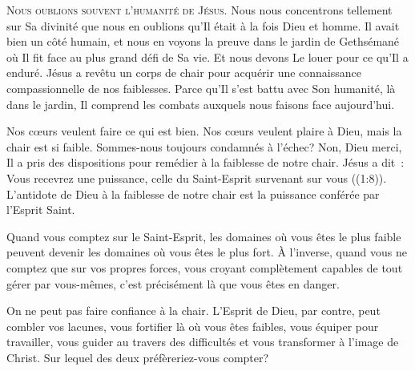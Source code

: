 


\lettrine{N}{ous oublions souvent l'humanité de Jésus.}
 Nous nous concentrons tellement sur Sa divinité que nous en oublions
 qu'Il était à la fois Dieu et homme. Il avait bien un côté humain,
 et nous en voyons la preuve dans le jardin de Gethsémané
 \ocadr où Il fit face au plus grand défi de Sa vie.
 Et nous devons Le  louer pour ce qu'Il a enduré.
 Jésus a revêtu un corps de chair pour acquérir une connaissance
 compassionnelle de nos faiblesses. Parce qu'Il s'est battu avec Son humanité,
 là dans le jardin, Il comprend les combats auxquels nous faisons
 face aujourd'hui.

Nos c\oe{}urs veulent faire ce qui est bien.
 Nos c\oe{}urs veulent plaire à Dieu, mais la chair est si faible.
 Sommes-nous toujours condamnés à l'échec? Non, Dieu merci,
 Il a pris des dispositions pour remédier à la faiblesse de notre chair.
 Jésus a dit~: 
 \og Vous recevrez une puissance, celle du Saint-Esprit survenant sur vous \fg{}
 ((1:8)).
 L'antidote de Dieu à la faiblesse de notre chair
 est la puissance conférée par l'Esprit Saint.


Quand vous comptez sur le Saint-Esprit, les domaines où vous êtes
 le plus faible peuvent devenir les domaines où vous êtes le plus fort.
 À l'inverse, quand vous ne comptez que sur vos propres forces,
 vous croyant complètement capables de tout gérer par vous-mêmes,
 c'est précisément là que vous êtes en danger.

On ne peut pas faire confiance à la chair.
 L'Esprit de Dieu, par contre, peut combler vos lacunes,
 vous fortifier là où vous êtes faibles, vous équiper pour travailler,
 vous guider au travers des difficultés et vous transformer
 à l'image de Christ. Sur lequel des deux préfèreriez-vous compter?


\dvrule




